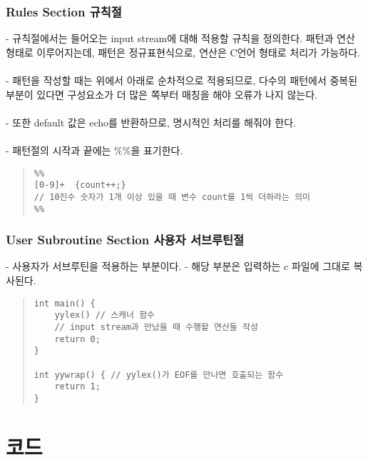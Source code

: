 \documentclass{article}
\begin{document}
\subsubsection{Rules Section 규칙절}
- 규칙절에서는 들어오는 input stream에 대해 적용할 규칙을 정의한다. 패턴과 연산 형태로 이루어지는데, 패턴은 정규표현식으로, 연산은 C언어 형태로 처리가 가능하다. \\ \\
- 패턴을 작성할 때는 위에서 아래로 순차적으로 적용되므로, 다수의 패턴에서 중복된 부분이 있다면 구성요소가 더 많은 쪽부터 매칭을 해야 오류가 나지 않는다. \\ \\
- 또한 default 값은 echo를 반환하므로, 명시적인 처리를 해줘야 한다. \\ \\
- 패턴절의 시작과 끝에는 \%\%을 표기한다. 
\\
\begin{quote}
\begin{verbatim}
%%
[0-9]+	{count++;}
// 10진수 숫자가 1개 이상 있을 때 변수 count를 1씩 더하라는 의미
%%
\end{verbatim}
\end{quote}

\subsubsection{User Subroutine Section 사용자 서브루틴절}
- 사용자가 서브루틴을 적용하는 부분이다. 
- 해당 부분은 입력하는 c 파일에 그대로 복사된다. 
\\
\begin{quote}
\begin{verbatim}
int main() {
    yylex() // 스캐너 함수 
    // input stream과 만났을 때 수행할 연산들 작성
    return 0;
}

int yywrap() { // yylex()가 EOF를 만나면 호출되는 함수
    return 1;
}

\end{verbatim}
\end{quote}

\section{코드}
\end{document}
